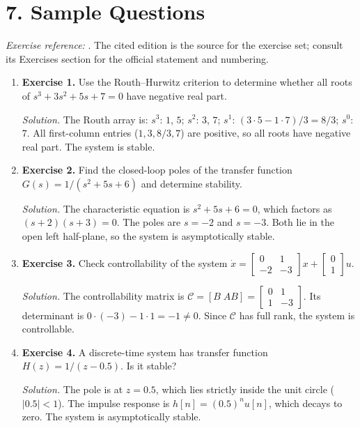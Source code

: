 \section*{7. Sample Questions}
\emph{Exercise reference:} \cite{control_theory_ref1}. The cited edition is the source for the exercise set; consult its Exercises section for the official statement and numbering.
\begin{enumerate}[leftmargin=*,itemsep=0.9em]

\item \textbf{Exercise 1.} Use the Routh--Hurwitz criterion to determine whether all roots of $s^3+3s^2+5s+7=0$ have negative real part.

\emph{Solution.} The Routh array is: $s^3$: $1$, $5$; $s^2$: $3$, $7$; $s^1$: $(3\cdot5-1\cdot7)/3=8/3$; $s^0$: $7$. All first-column entries ($1,3,8/3,7$) are positive, so all roots have negative real part. The system is stable.

\item \textbf{Exercise 2.} Find the closed-loop poles of the transfer function $G(s)=1/(s^2+5s+6)$ and determine stability.

\emph{Solution.} The characteristic equation is $s^2+5s+6=0$, which factors as $(s+2)(s+3)=0$. The poles are $s=-2$ and $s=-3$. Both lie in the open left half-plane, so the system is asymptotically stable.

\item \textbf{Exercise 3.} Check controllability of the system $\dot x=\begin{bmatrix}0&1\\-2&-3\end{bmatrix}x+\begin{bmatrix}0\\1\end{bmatrix}u$.

\emph{Solution.} The controllability matrix is $\mathcal C=[B\;AB]=\begin{bmatrix}0&1\\1&-3\end{bmatrix}$. Its determinant is $0\cdot(-3)-1\cdot1=-1\neq0$. Since $\mathcal C$ has full rank, the system is controllable.

\item \textbf{Exercise 4.} A discrete-time system has transfer function $H(z)=1/(z-0.5)$. Is it stable?

\emph{Solution.} The pole is at $z=0.5$, which lies strictly inside the unit circle ($|0.5|<1$). The impulse response is $h[n]=(0.5)^n u[n]$, which decays to zero. The system is asymptotically stable.


\end{enumerate}
